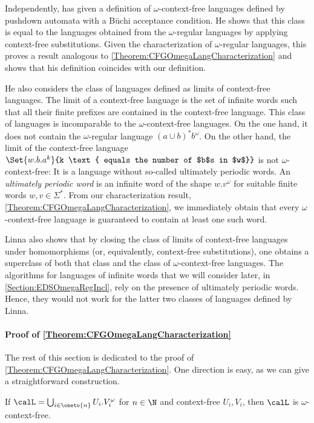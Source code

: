\documentclass[../../diss.tex]{subfiles}
\begin{document}
Independently,  has given a definition of $\omega$-context-free languages defined by pushdown automata with a Büchi acceptance condition.
He shows that this class is equal to the languages obtained from the $\omega$-regular languages by applying context-free substitutions.
Given the characterization of $\omega$-regular languages, this proves a result analogous to \cref{Theorem:CFGOmegaLangCharacterization} and shows that his definition coincides with our definition.

He also considers the class of languages defined as limits of context-free languages.
The limit of a context-free language is the set of infinite words such that all their finite prefixes are contained in the context-free language.
This class of languages is incomparable to the $\omega$-context-free languages.
On the one hand, it does not contain the $\omega$-regular language ${(a \cup b)}^* b^\omega$.
On the other hand, the limit of the context-free language $\Set{ w.b.a^k}{k \text{ equals the number of $b$s in $w$}}$ is not $\omega$-context-free: It is a language without so-called ultimately periodic words.
An \emph{ultimately periodic word} is an infinite word of the shape $w.v^\omega$ for suitable finite words $w, v \in \Sigma^*$.
From our characterization result, \cref{Theorem:CFGOmegaLangCharacterization}, we immediately obtain that every $\omega$-context-free language is guaranteed to contain at least one such word.

Linna also shows that by closing the class of limits of context-free languages under homomorphisms (or, equivalently, context-free substitutions), one obtains a superclass of both that class and the class of $\omega$-context-free languages.
The algorithms for languages of infinite words that we will consider later, \eg in \cref{Section:EDSOmegaRegIncl}, rely on the presence of ultimately periodic words.
Hence, they would not work for the latter two classes of languages defined by Linna.

\paragraph{Proof of \cref{Theorem:CFGOmegaLangCharacterization}}

The rest of this section is dedicated to the proof of \cref{Theorem:CFGOmegaLangCharacterization}.
One direction is easy, as we can give a straightforward construction.

\begin{lemma}
    If \( \calL = \bigcup_{i \in \oneto{n}} U_i . V_i^\omega \) for $n \in \N$ and context-free $U_i, V_i$, then $\calL$ is $\omega$-context-free.
\end{lemma}
\end{document}

